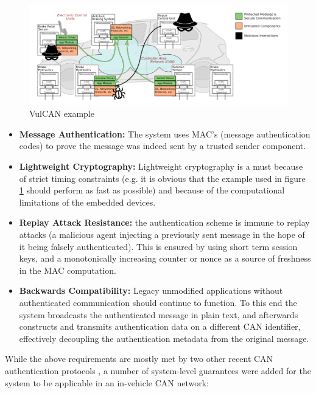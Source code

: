 \documentclass[11pt]{article}
\begin{document}
\begin{figure}[h]
	\caption{VulCAN example \cite{VulCAN}}
	\label{fig:vulcan}
	\centering
	\includegraphics[width=\textwidth]{VulCAN}
\end{figure}

\begin{itemize}
	\item \textbf{Message Authentication:} The system uses MAC's (message authentication codes) to prove the message was indeed sent by a trusted sender component.
	
	\item \textbf{Lightweight Cryptography:} Lightweight cryptography is a must because of strict timing constraints (e.g. it is obvious that the example used in figure \ref{fig:vulcan} should perform as fast as possible) and because of the computational limitations of the embedded devices.
	
	\item \textbf{Replay Attack Resistance:} the authentication scheme is immune to replay attacks (a malicious agent injecting a previously sent message in the hope of it being falsely authenticated). This is ensured by using short term session keys, and a monotonically increasing counter or nonce as a source of freshness in the MAC computation.
	
	\item \textbf{Backwards Compatibility:} Legacy unmodified applications without authenticated communication should continue to function. To this end the system broadcasts the authenticated message in plain text, and afterwards constructs and transmits authentication data on a different CAN identifier, effectively decoupling the authentication metadata from the original message. 	
\end{itemize}

While the above requirements are mostly met by two other recent CAN authentication protocols \cite{Leia} \cite{VatiCAN}, a number of system-level guarantees were added for the system to be applicable in an in-vehicle CAN network:
\end{document}
